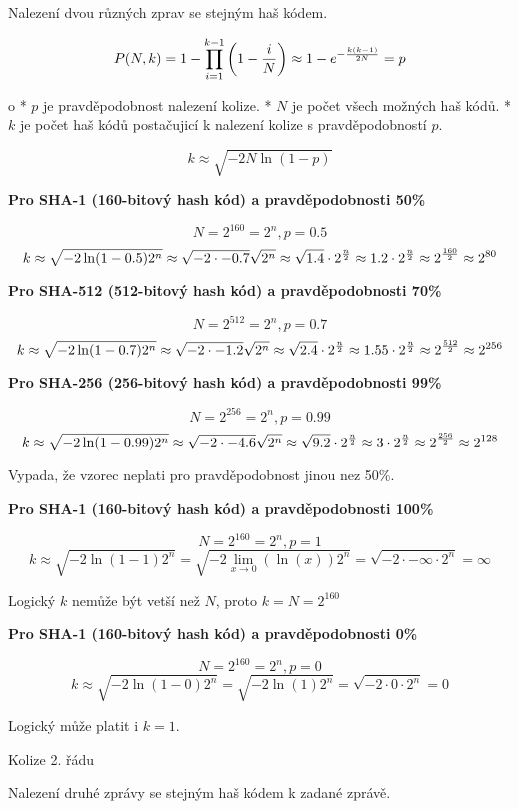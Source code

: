 Nalezení dvou různých zprav se stejným haš kódem.

$$
P(N,k) = 1 - \prod^{k-1}_{i=1}\left( 1 - {i \over N} \right)
\approx 1 - e^{-{k(k-1) \over 2N}}= p
$$

\begitems \style o
* $p$ je pravděpodobnost nalezení kolize.
* $N$ je počet všech možných haš kódů.
* $k$ je počet haš kódů postačujicí k nalezení kolize s pravděpodobností $p$.
\enditems

$$k \approx \sqrt{-2N\ln(1 - p)}$$

{\bf Pro SHA-1 (160-bitový hash kód) a pravděpodobnosti 50\%}

$$N = 2^{160} = 2^n, p = 0.5$$
$$
k \approx \sqrt{-2 \ln(1 - 0.5) 2^n} \approx \sqrt{-2 \cdot -0.7}\sqrt{2^n}
\approx \sqrt{1.4} \cdot 2^{n \over 2} \approx 1.2 \cdot 2^{n \over 2}
\approx 2^{160 \over 2} \approx 2^{80}
$$

{\bf Pro SHA-512 (512-bitový hash kód) a pravděpodobnosti 70\%}

$$N = 2^{512} = 2^n, p = 0.7$$
$$
k \approx \sqrt{-2 \ln(1 - 0.7) 2^n} \approx \sqrt{-2 \cdot -1.2}\sqrt{2^n}
\approx \sqrt{2.4} \cdot 2^{n \over 2} \approx 1.55 \cdot 2^{n \over 2}
\approx 2^{512 \over 2} \approx 2^{256}
$$

{\bf Pro SHA-256 (256-bitový hash kód) a pravděpodobnosti 99\%}

$$N = 2^{256} = 2^n, p = 0.99$$
$$
k \approx \sqrt{-2 \ln(1 - 0.99) 2^n} \approx \sqrt{-2 \cdot -4.6}\sqrt{2^n}
\approx \sqrt{9.2} \cdot 2^{n \over 2} \approx 3 \cdot 2^{n \over 2}
\approx 2^{256 \over 2} \approx 2^{128}
$$

Vypada, že vzorec neplati pro pravděpodobnost jinou nez 50\%.

{\bf Pro SHA-1 (160-bitový hash kód) a pravděpodobnosti 100\%}

$$N = 2^{160} = 2^n, p = 1$$
$$
k \approx \sqrt{-2 \ln(1 - 1) 2^n} = \sqrt{-2 \lim_{x \rightarrow 0} {(\ln(x))} 2^n}
= \sqrt{-2 \cdot -\infty \cdot 2^n} = \infty
$$

Logický $k$ nemůže být vetší než $N$, proto $k = N = 2^{160}$

{\bf Pro SHA-1 (160-bitový hash kód) a pravděpodobnosti 0\%}

$$N = 2^{160} = 2^n, p = 0$$
$$
k \approx \sqrt{-2 \ln(1 - 0) 2^n} = \sqrt{-2 \ln(1) 2^n}
= \sqrt{-2 \cdot 0 \cdot 2^n} = 0
$$

Logický může platit i $k = 1$.

\sec Kolize 2. řádu

Nalezení druhé zprávy se stejným haš kódem k zadané zprávě.

